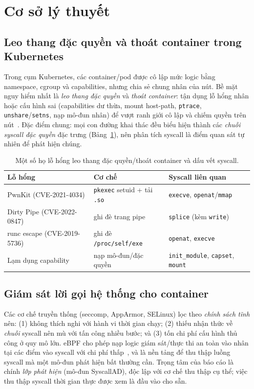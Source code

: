 \section{Cơ sở lý thuyết}
\label{sec:background}

\subsection{Leo thang đặc quyền và thoát container trong Kubernetes}
Trong cụm Kubernetes, các container/pod được cô lập mức logic bằng namespace,
cgroup và capabilities, nhưng chia sẻ chung nhân của nút. Bề mặt nguy hiểm nhất là
\emph{leo thang đặc quyền} và \emph{thoát container}: tận dụng lỗ hổng nhân hoặc
cấu hình sai (capabilities dư thừa, mount host-path, \texttt{ptrace},
\texttt{unshare}/\texttt{setns}, nạp mô-đun nhân) để vượt ranh giới cô lập và chiếm
quyền trên nút~\cite{ref5_combe_docker}. Đặc điểm chung: mọi con đường khai thác đều
biểu hiện thành các \emph{chuỗi syscall đặc quyền} đặc trưng (Bảng~\ref{tab:bg-cve}),
nên phân tích syscall là điểm quan sát tự nhiên để phát hiện chúng.

\begin{table}[htbp]
  \centering
  \caption{Một số họ lỗ hổng leo thang đặc quyền/thoát container và dấu vết syscall.}
  \label{tab:bg-cve}
  \small
  \begin{tabularx}{\linewidth}{@{}l >{\raggedright\arraybackslash}p{3.6cm} >{\raggedright\arraybackslash}X@{}}
    \toprule
    \textbf{Lỗ hổng} & \textbf{Cơ chế} & \textbf{Syscall liên quan} \\
    \midrule
    PwnKit (CVE-2021-4034)   & \texttt{pkexec} setuid + tải \texttt{.so} & \texttt{execve}, \texttt{openat}/\texttt{mmap} \\
    Dirty Pipe (CVE-2022-0847) & ghi đè trang pipe    & \texttt{splice} (kèm \texttt{write}) \\
    runc escape (CVE-2019-5736) & ghi đè \texttt{/proc/self/exe} & \texttt{openat}, \texttt{execve} \\
    Lạm dụng capability        & nạp mô-đun/đặc quyền  & \texttt{init\_module}, \texttt{capset}, \texttt{mount} \\
    \bottomrule
  \end{tabularx}
\end{table}

\subsection{Giám sát lời gọi hệ thống cho container}
Các cơ chế truyền thống (seccomp, AppArmor, SELinux) lọc theo \emph{chính sách
tĩnh} nên: (1) không thích nghi với hành vi thời gian chạy; (2) thiếu nhận thức về
\emph{chuỗi} syscall nên mù với tấn công nhiều bước; và (3) tốn chi phí cấu hình thủ
công ở quy mô lớn. eBPF cho phép nạp logic giám sát/thực thi an toàn vào nhân tại
các điểm vào syscall với chi phí thấp~\cite{ref20_bpf_security}, và là nền tảng để
thu thập luồng syscall mà một mô-đun phát hiện bất thường cần. Trọng tâm của báo cáo
là chính \emph{lớp phát hiện} (mô-đun SyscallAD), độc lập với cơ chế thu thập cụ thể;
việc thu thập syscall thời gian thực được xem là đầu vào cho sẵn.

